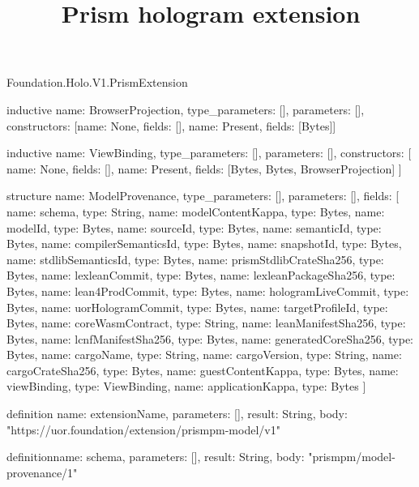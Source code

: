 \begin{lexlean}{Foundation.Holo.V1.PrismExtension}
\title{Prism hologram extension}
\begin{semanticmodule}
inductive{
  name: BrowserProjection,
  type_parameters: [],
  parameters: [],
  constructors: [{name: None, fields: []}, {name: Present, fields: [Bytes]}]
}

inductive{
  name: ViewBinding,
  type_parameters: [],
  parameters: [],
  constructors: [
    {name: None, fields: []},
    {name: Present, fields: [Bytes, Bytes, BrowserProjection]}
  ]
}

structure{
  name: ModelProvenance,
  type_parameters: [],
  parameters: [],
  fields: [
    {name: schema, type: String},
    {name: modelContentKappa, type: Bytes},
    {name: modelId, type: Bytes},
    {name: sourceId, type: Bytes},
    {name: semanticId, type: Bytes},
    {name: compilerSemanticsId, type: Bytes},
    {name: snapshotId, type: Bytes},
    {name: stdlibSemanticsId, type: Bytes},
    {name: prismStdlibCrateSha256, type: Bytes},
    {name: lexleanCommit, type: Bytes},
    {name: lexleanPackageSha256, type: Bytes},
    {name: lean4ProdCommit, type: Bytes},
    {name: hologramLiveCommit, type: Bytes},
    {name: uorHologramCommit, type: Bytes},
    {name: targetProfileId, type: Bytes},
    {name: coreWasmContract, type: String},
    {name: leanManifestSha256, type: Bytes},
    {name: lcnfManifestSha256, type: Bytes},
    {name: generatedCoreSha256, type: Bytes},
    {name: cargoName, type: String},
    {name: cargoVersion, type: String},
    {name: cargoCrateSha256, type: Bytes},
    {name: guestContentKappa, type: Bytes},
    {name: viewBinding, type: ViewBinding},
    {name: applicationKappa, type: Bytes}
  ]
}

definition{
  name: extensionName,
  parameters: [],
  result: String,
  body: "https://uor.foundation/extension/prismpm-model/v1"
}

definition{name: schema, parameters: [], result: String, body: "prismpm/model-provenance/1"}
\end{semanticmodule}
\end{lexlean}
